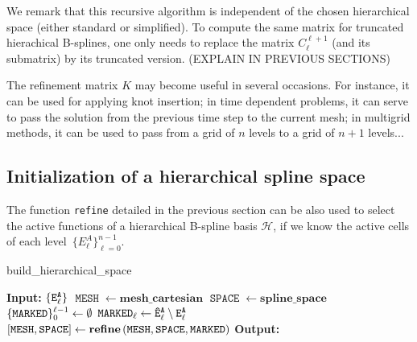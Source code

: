 \documentclass[a4paper]{siamltex1213}
\newcommand{\Rd}{\color{red}}
\newcommand{\activeelements}[1]{\tt E^A_{#1}}
\DeclareMathOperator\mesh{\texttt{MESH}}
\DeclareMathOperator\basis{\texttt{SPACE}}
\DeclareMathOperator\marked{\tt MARKED}
\newcommand\QQ{\mathcal Q}
\newcommand\HH{\mathcal H}
\begin{document}
We remark that this recursive algorithm is independent of the chosen hierarchical space (either standard or simplified). To compute the same matrix for truncated hierachical B-splines, one only needs to replace the matrix $C_\ell^{\ell+1}$ (and its submatrix) by its truncated version. {\Rd (EXPLAIN IN PREVIOUS SECTIONS)}

The refinement matrix $K$ may become useful in several occasions. For instance, it can be used for applying knot insertion; in time dependent problems, it can serve to pass the solution from the previous time step to the current mesh; in multigrid methods, it can be used to pass from a grid of $n$ levels to a grid of $n+1$ levels...

\subsection{Initialization of a hierarchical spline space}

The function \texttt{refine} detailed in the previous section can be also used to select the active functions of a hierarchical B-spline basis $\HH$, if we know the active cells of each level~$\{E^A_\ell\}_{\ell=0}^{n-1}$. 

\begin{algorithm}
\caption{build\_hierarchical\_space}
\begin{algorithmic}[1]
\Statex \textbf{Input:} $\{\activeelements{\ell}\}$
\State $\mesh \gets \textbf{mesh\_cartesian}$  
\State $\basis \gets \textbf{spline\_space}$  
  \State $\{\marked\}_0^{\ell-1} \gets \emptyset$
  \State $\marked_\ell \gets \tt{\hat E^A_\ell} \setminus \activeelements{\ell}$
  \State $[\mesh, \basis] \gets \textbf{refine} \, (\mesh, \basis, \marked)$
\EndFor
\Statex \textbf{Output:}
\end{algorithmic}
\end{algorithm}


\end{document}
